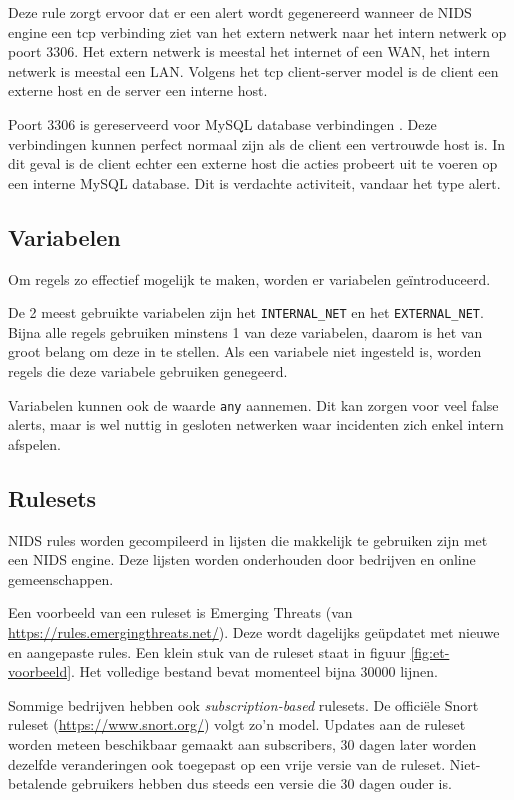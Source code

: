 \documentclass[a4paper,12pt]{report}
\begin{document}
Deze rule zorgt ervoor dat er een alert wordt gegenereerd wanneer de NIDS engine een tcp verbinding ziet van het extern netwerk naar het intern netwerk op poort 3306.
Het extern netwerk is meestal het internet of een WAN, het intern netwerk is meestal een LAN.
Volgens het tcp client-server model is de client een externe host en de server een interne host.

Poort 3306 is gereserveerd voor MySQL database verbindingen \autocite{iana:ports}.
Deze verbindingen kunnen perfect normaal zijn als de client een vertrouwde host is.
In dit geval is de client echter een externe host die acties probeert uit te voeren op een interne MySQL database.
Dit is verdachte activiteit, vandaar het type alert.

\subsection{Variabelen}
Om regels zo effectief mogelijk te maken, worden er variabelen geïntroduceerd.

De 2 meest gebruikte variabelen zijn het \lstinline|INTERNAL_NET| en het \lstinline|EXTERNAL_NET|.
Bijna alle regels gebruiken minstens 1 van deze variabelen, daarom is het van groot belang om deze in te stellen.
Als een variabele niet ingesteld is, worden regels die deze variabele gebruiken genegeerd.

Variabelen kunnen ook de waarde \lstinline|any| aannemen.
Dit kan zorgen voor veel false alerts, maar is wel nuttig in gesloten netwerken waar incidenten zich enkel intern afspelen.

\subsection{Rulesets}
NIDS rules worden gecompileerd in lijsten die makkelijk te gebruiken zijn met een NIDS engine.
Deze lijsten worden onderhouden door bedrijven en online gemeenschappen.

Een voorbeeld van een ruleset is Emerging Threats (van \url{https://rules.emergingthreats.net/}).
Deze wordt dagelijks geüpdatet met nieuwe en aangepaste rules.
Een klein stuk van de ruleset staat in figuur \ref{fig:et-voorbeeld}.
Het volledige bestand bevat momenteel bijna $30000$ lijnen.

Sommige bedrijven hebben ook \emph{subscription-based} rulesets.
De officiële Snort ruleset (\url{https://www.snort.org/}) volgt zo'n model.
Updates aan de ruleset worden meteen beschikbaar gemaakt aan subscribers, 30 dagen later worden dezelfde veranderingen ook toegepast op een vrije versie van de ruleset.
Niet-betalende gebruikers hebben dus steeds een versie die 30 dagen ouder is.
\end{document}
